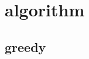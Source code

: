 %         
%         
    
%         

        
\section{algorithm}
    \subsection{greedy}
         \columnbreak

